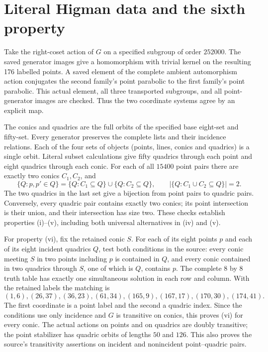\documentclass[11pt]{article}
\begin{document}
\section*{Literal Higman data and the sixth property}
Take the right-coset action of $G$ on a specified subgroup of order
$252000$.  The saved generator images give a homomorphism with trivial
kernel on the resulting 176 labelled points.  A saved element of the
complete ambient automorphism action conjugates the second family's
point parabolic to the first family's point parabolic.  This actual
element, all three transported subgroups, and all point-generator images
are checked.  Thus the two coordinate systems agree by an explicit map.

The conics and quadrics are the full orbits of the specified base
eight-set and fifty-set.  Every generator preserves the complete lists
and their incidence relations.  Each of the four sets of objects
(points, lines, conics and quadrics) is a single orbit.  Literal subset
calculations give fifty quadrics through each point and eight quadrics
through each conic.  For each of all $15400$ point pairs there are
exactly two conics $C_1,C_2$, and
\[
 \{Q:p,p'\in Q\}=\{Q:C_1\subseteq Q\}\cup\{Q:C_2\subseteq Q\},
 \qquad |\{Q:C_1\cup C_2\subseteq Q\}|=2.                  \tag{2}
\]
The two quadrics in the last set give a bijection from point pairs to
quadric pairs.  Conversely, every quadric pair contains exactly two
conics; its point intersection is their union, and their intersection
has size two.  These checks establish properties (i)--(v), including
both universal alternatives in (iv) and (v).

For property (vi), fix the retained conic $S$.  For each of its eight
points $p$ and each of its eight incident quadrics $Q$, test both
conditions in the source: every conic meeting $S$ in two points including
$p$ is contained in $Q$, and every conic contained in two quadrics
through $S$, one of which is $Q$, contains $p$.  The complete $8$ by $8$
truth table has exactly one simultaneous solution in each row and
column.  With the retained labels the matching is
\[
 (1,6),(26,37),(36,23),(61,34),(165,9),(167,17),(170,30),(174,41).
\]
The first coordinate is a point label and the second a quadric index.
Since the conditions use only incidence and $G$ is transitive on conics,
this proves (vi) for every conic.  The actual actions on points and on
quadrics are doubly transitive; the point stabilizer has quadric orbits
of lengths $50$ and $126$.  This also proves the source's transitivity
assertions on incident and nonincident point--quadric pairs.
\end{document}
